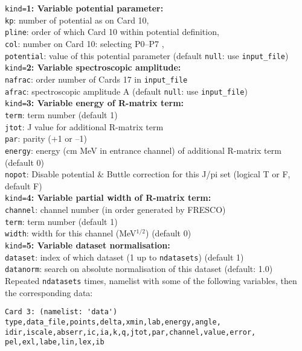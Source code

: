\documentclass[11pt]{article}
\begin{document}
{\tt kind=}{\bf 1: Variable potential parameter:}\\
{\tt kp}: number of potential as on Card 10,\\
{\tt pline}: order of which Card 10 within potential definition,\\
{\tt col}:   number on Card 10: selecting P0--P7 ,\\
{\tt potential}: value of this potential parameter (default {\tt null}: use {\tt input\_file})\\

{\tt kind=}{\bf 2: Variable spectroscopic amplitude:}\\
{\tt nafrac}: order number of Cards 17 in {\tt input\_file}\\
{\tt afrac}: spectroscopic amplitude A (default {\tt null}: use {\tt input\_file})\\

{\tt kind=}{\bf 3: Variable energy of R-matrix term:}\\
{\tt term}: term number (default 1)\\
{\tt jtot}: J value for additional R-matrix term\\
{\tt par}: parity (+1 or --1)\\
{\tt energy}: energy (cm MeV in entrance channel) of additional R-matrix term (default 0)\\
{\tt nopot}: Disable potential \& Buttle correction for this J/pi set (logical T or F, default F)\\

{\tt kind=}{\bf 4: Variable partial width of R-matrix term:}\\
{\tt channel}: channel number (in order generated by FRESCO)\\
{\tt term}: term number (default 1)\\
{\tt width}: width for this channel (MeV$^{1/2}$) (default 0)\\

{\tt kind=}{\bf 5: Variable dataset normalisation:}\\
{\tt dataset}: index of which dataset (1 up to {\tt ndatasets}) (default 1)\\
{\tt datanorm}: search on absolute normalisation of this dataset (default: 1.0)\\

Repeated {\tt ndatasets} times, namelist with some of the following variables, then the
corresponding data:
\begin{verbatim}
Card 3: (namelist: 'data')
type,data_file,points,delta,xmin,lab,energy,angle,
idir,iscale,abserr,ic,ia,k,q,jtot,par,channel,value,error,
pel,exl,labe,lin,lex,ib
\end{verbatim}
\end{document}
